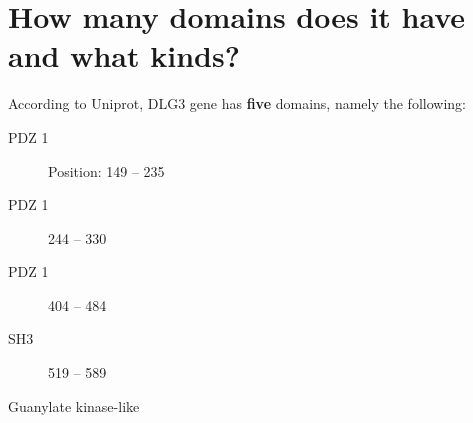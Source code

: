 \section{How many domains does it have and what kinds?}
According to Uniprot, DLG3 gene has \textbf{five} domains, namely the following:
\begin{description}
\item[PDZ 1] Position: 149 – 235
\item[PDZ 1] 244 – 330
\item[PDZ 1] 404 – 484	
\item[SH3] 519 – 589
\item[Guanylate kinase-like]
\end{description}